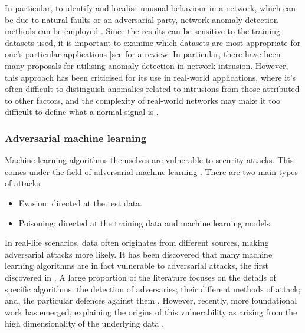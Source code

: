 \documentclass[twocolumn, aps, rmp, amsmath, amssymb, nofootinbib, superscriptaddress, longbibliography, floatfix, table-of-contents, eqsecnum]{revtex4}
\begin{document}
In particular, to identify and localise unusual behaviour in a network, which can be due to natural faults or an adversarial party, network anomaly detection methods can be employed \cite{bib:ahmed2007machine, bib:fraley2017promise, bib:joseph2013machine}. Since the results can be sensitive to the training datasets used, it is important to examine which datasets are most appropriate for one's particular applications [see \cite{bib:yavanoglu2017review} for a review. In particular, there have been many proposals for utilising anomaly detection in network intrusion. However, this approach has been criticised for its use in real-world applications, where it's often difficult to distinguish anomalies related to intrusions from those attributed to other factors, and the complexity of real-world networks may make it too difficult to define what a normal signal is \cite{bib:sommer2010outside}.

\subsubsection{Adversarial machine learning}

Machine learning algorithms themselves are vulnerable to security attacks. This comes under the field of adversarial machine learning \cite{bib:huang2011adversarial}. There are two main types of attacks:
\begin{itemize}
\item Evasion: directed at the test data.
\item Poisoning: directed at the training data and machine learning models.
\end{itemize}

In real-life scenarios, data often originates from different sources, making adversarial attacks more likely. It has been discovered that many machine learning algorithms are in fact vulnerable to adversarial attacks, the first discovered in \cite{bib:szegedy2013intriguing}. A large proportion of the literature focuses on the details of specific algorithms: the detection of adversaries; their different methods of attack; and, the particular defences against them \cite{bib:kurakin2018adversarial}. However, recently, more foundational work has emerged, explaining the origins of this vulnerability as arising from the high dimensionality of the underlying data \cite{bib:goodfellow2014explaining, bib:gilmer2018adversarial, bib:mahloujifar2018curse}.
\end{document}
